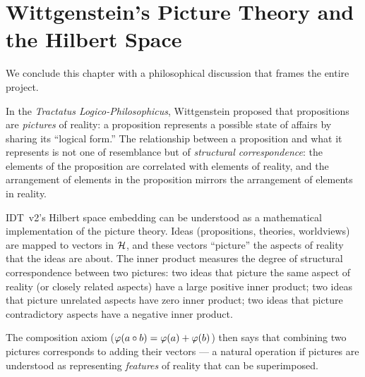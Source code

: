 \section{Wittgenstein's Picture Theory and the Hilbert Space}

We conclude this chapter with a philosophical discussion that frames the
entire project.

In the \emph{Tractatus Logico-Philosophicus}, Wittgenstein proposed that
propositions are \emph{pictures} of reality: a proposition represents a possible
state of affairs by sharing its ``logical form.'' The relationship between a
proposition and what it represents is not one of resemblance but of
\emph{structural correspondence}: the elements of the proposition are correlated
with elements of reality, and the arrangement of elements in the proposition
mirrors the arrangement of elements in reality.

IDT~v2's Hilbert space embedding can be understood as a mathematical
implementation of the picture theory. Ideas (propositions, theories, worldviews)
are mapped to vectors in $\mathcal{H}$, and these vectors ``picture'' the aspects
of reality that the ideas are about. The inner product measures the degree of
structural correspondence between two pictures: two ideas that picture the same
aspect of reality (or closely related aspects) have a large positive inner
product; two ideas that picture unrelated aspects have zero inner product; two
ideas that picture contradictory aspects have a negative inner product.

The composition axiom ($\varphi(a \circ b) = \varphi(a) + \varphi(b)$) then
says that combining two pictures corresponds to adding their vectors --- a
natural operation if pictures are understood as representing \emph{features}
of reality that can be superimposed.

